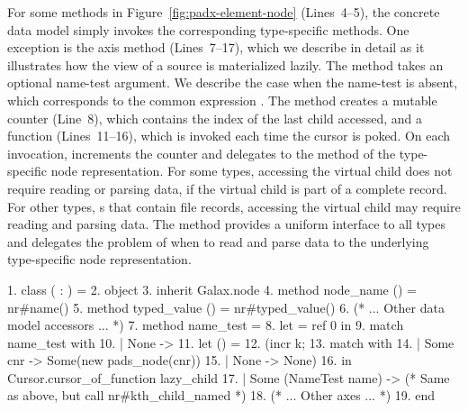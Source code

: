 For some methods in Figure~\ref{fig:padx-element-node} (Lines~4--5),
the concrete data model simply invokes the corresponding type-specific
methods.  One exception is the  axis method (Lines~7--17),
which we describe in detail as it illustrates how the \Xml{} view of a
\pads{} source is materialized lazily.
The  method takes an optional name-test argument.  We
describe the case when the name-test is absent, which corresponds to
the common expression .  The  method creates a
mutable counter  (Line~8), which contains the index of the
last child accessed, and a function  (Lines~11--16),
which is invoked each time the  cursor is poked.  On each
invocation,  increments the counter and delegates to
the  method of the type-specific node representation.
For some \pads{} types, accessing the virtual  child does not
require reading or parsing data, \eg{} if the virtual child is part of
a complete \pads{} record.  For other \pads{} types, \eg{} s that
contain file records, accessing the virtual  child may require
reading and parsing data.  The  method provides a
uniform interface to all types and delegates the problem of when to
read and parse data to the underlying type-specific node
representation.
\begin{figure*}
\begin{small}
\begin{code}
{ 1}. class  ( : ) =  
{ 2}. object 
{ 3}.   inherit Galax.node
{ 4}.   method node\_name   () = nr#name()
{ 5}.   method typed\_value () = nr#typed_value() 
{ 6}.   (* ... Other data model accessors ... *)
{ 7}.   method  name\_test =  
{ 8}.     let  = ref 0 in
{ 9}.     match name\_test with 
{10}.     | None ->  
{11}.       let  () = 
{12}.        (incr k;
{13}.         match   with
{14}.         | Some cnr ->  Some(new pads\_node(cnr))
{15}.         | None -> None)
{16}.       in Cursor.cursor\_of\_function lazy\_child
{17}.     | Some (NameTest name) -> 
            (* Same as above, but call nr#kth\_child\_named *)
{18}.   (* ... Other axes ... *)
{19}. end
\end{code}
\end{small}
\caption{Fragment of the \padx{} concrete data model}
\label{fig:padx-element-node}
\end{figure*}

